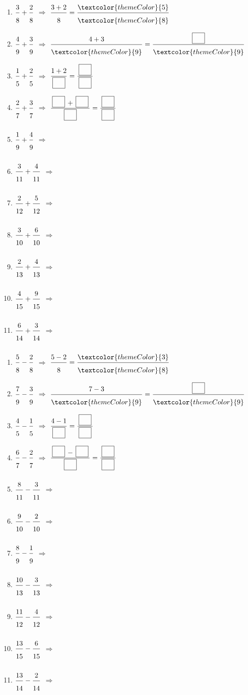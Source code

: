 \begin{enumerate}[leftmargin=*,align=parleft, label=\alph*), itemsep=9pt]
\item $\FA{3}{8}+\FA{2}{8}$ \quad $\Longrightarrow$ \quad $\FA{3 + 2}{8}=\FA{\textcolor{themeColor}{5}}{\textcolor{themeColor}{8}}$
\item $\FA{4}{9}+\FA{3}{9}$ \quad $\Longrightarrow$ \quad $\FA{4 + 3}{\textcolor{themeColor}{9}}=\FA{\CaseC}{\textcolor{themeColor}{9}}$
\item $\FA{1}{5}+\FA{2}{5}$ \quad $\Longrightarrow$ \quad $\FA{1 + 2}{\CaseC}=\FA{\CaseC}{\CaseC}$
\item $\FA{2}{7}+\FA{3}{7}$ \quad $\Longrightarrow$ \quad $\FA{\CaseC + \CaseC}{\CaseC}=\FA{\CaseC}{\CaseC}$
\item $\FA{1}{9}+\FA{4}{9}$ \quad $\Longrightarrow$
\item $\FA{3}{11}+\FA{4}{11}$ \quad $\Longrightarrow$
\item $\FA{2}{12}+\FA{5}{12}$ \quad $\Longrightarrow$
\item $\FA{3}{10}+\FA{6}{10}$ \quad $\Longrightarrow$
\item $\FA{2}{13}+\FA{4}{13}$ \quad $\Longrightarrow$
\item $\FA{4}{15}+\FA{9}{15}$ \quad $\Longrightarrow$
\item $\FA{6}{14}+\FA{3}{14}$ \quad $\Longrightarrow$
\end{enumerate}
 
\newpage
{}
 
\begin{enumerate}[leftmargin=*,align=parleft, label=\alph*), itemsep=9pt]
\item $\FA{5}{8}-\FA{2}{8}$ \quad $\Longrightarrow$ \quad $\FA{5 - 2}{8}=\FA{\textcolor{themeColor}{3}}{\textcolor{themeColor}{8}}$
\item $\FA{7}{9}-\FA{3}{9}$ \quad $\Longrightarrow$ \quad $\FA{7 - 3}{\textcolor{themeColor}{9}}=\FA{\CaseC}{\textcolor{themeColor}{9}}$
\item $\FA{4}{5}-\FA{1}{5}$ \quad $\Longrightarrow$ \quad $\FA{4 - 1}{\CaseC}=\FA{\CaseC}{\CaseC}$
\item $\FA{6}{7}-\FA{2}{7}$ \quad $\Longrightarrow$ \quad $\FA{\CaseC - \CaseC}{\CaseC}=\FA{\CaseC}{\CaseC}$
\item $\FA{8}{11}-\FA{3}{11}$ \quad $\Longrightarrow$
\item $\FA{9}{10}-\FA{2}{10}$ \quad $\Longrightarrow$
\item $\FA{8}{9}-\FA{1}{9}$ \quad $\Longrightarrow$
\item $\FA{10}{13}-\FA{3}{13}$ \quad $\Longrightarrow$
\item $\FA{11}{12}-\FA{4}{12}$ \quad $\Longrightarrow$
\item $\FA{13}{15}-\FA{6}{15}$ \quad $\Longrightarrow$
\item $\FA{13}{14}-\FA{2}{14}$ \quad $\Longrightarrow$
\end{enumerate}
 
